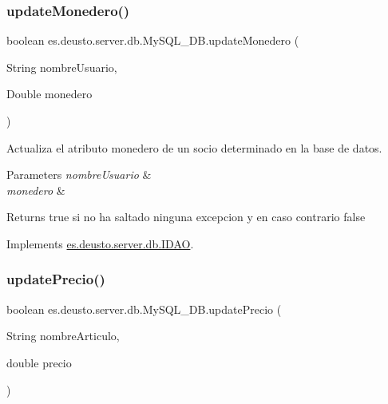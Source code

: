 \mbox{\label{classes_1_1deusto_1_1server_1_1db_1_1_my_s_q_l___d_b_a202f75db3e7f693f85af3fa38d7f1939}} 
\subsubsection{\texorpdfstring{updateMonedero()}{updateMonedero()}}
{\footnotesize\ttfamily boolean es.\+deusto.\+server.\+db.\+My\+S\+Q\+L\+\_\+\+D\+B.\+update\+Monedero (\begin{DoxyParamCaption}\item[{String}]{nombre\+Usuario,  }\item[{Double}]{monedero }\end{DoxyParamCaption})}

Actualiza el atributo monedero de un socio determinado en la base de datos. 
\begin{DoxyParams}{Parameters}
{\em nombre\+Usuario} & \\
\hline
{\em monedero} & \\
\hline
\end{DoxyParams}
\begin{DoxyReturn}{Returns}
true si no ha saltado ninguna excepcion y en caso contrario false 
\end{DoxyReturn}


Implements \mbox{\hyperlink{interfacees_1_1deusto_1_1server_1_1db_1_1_i_d_a_o_a59a5efa0070985e6baa0d2890b9ac266}{es.\+deusto.\+server.\+db.\+I\+D\+AO}}.

\mbox{\label{classes_1_1deusto_1_1server_1_1db_1_1_my_s_q_l___d_b_ab906a09145b0248413b7f17342f15bd2}} 
\subsubsection{\texorpdfstring{updatePrecio()}{updatePrecio()}}
{\footnotesize\ttfamily boolean es.\+deusto.\+server.\+db.\+My\+S\+Q\+L\+\_\+\+D\+B.\+update\+Precio (\begin{DoxyParamCaption}\item[{String}]{nombre\+Articulo,  }\item[{double}]{precio }\end{DoxyParamCaption})}

